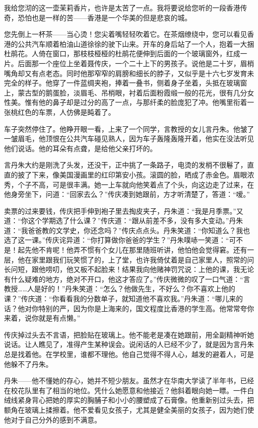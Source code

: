 \par 我给您沏的这一壶茉莉香片，也许是太苦了一点。我将要说给您听的一段香港传奇，恐怕也是一样的苦——香港是一个华美的但是悲哀的城。
\par 您先倒上一杯茶——当心烫！您尖着嘴轻轻吹着它。在茶烟缭绕中，您可以看见香港的公共汽车顺着柏油山道徐徐的驶下山来。开车的身后站了一个人，抱着一大捆杜鹃花。人倚在窗口，那枝枝桠桠的杜鹃花便伸到后面的一个玻璃窗外，红成一片。后面那一个座位上坐着聂传庆，一个二十上下的男孩子。说他是二十岁，眉梢嘴角却又有点老态。同时他那窄窄的肩膀和细长的脖子，又似乎是十六七岁发育未完全的样子。他穿了一件蓝绸夹袍，捧着一叠书，侧着身子坐着，头抵在玻璃窗上，蒙古型的鹅蛋脸，淡眉毛、吊梢眼，衬着后面粉霞缎一般的花光，很有几分女性美。惟有他的鼻子却是过分的高了一点，与那纤柔的脸庞犯了冲。他嘴里衔着一张桃红色的车票，人仿佛是盹着了。
\par 车子突然停住了。他睁开眼一看，上来了一个同学，言教授的女儿言丹朱。他皱了一皱眉毛，他顶恨在公共汽车碰见熟人，因为车子轰隆轰隆开着，他实在没法听见他们说话。他的耳朵有点聋，是给他父亲打坏的。
\par 言丹朱大约是刚洗了头发，还没干，正中挑了一条路子，电烫的发梢不很鬈了，直直的披了下来，像美国漫画里的红印第安小孩。滚圆的脸，晒成了赤金色。眉眼浓秀，个子不高，可是很丰满。她一上车就向他笑着点了个头，向这边走了过来，在他身旁坐下，问道：“回家去么？”传庆凑到她跟前，方才听清楚了，答道：“嗳。”
\par 卖票的过来要钱，传庆把手伸到袍子里去掏皮夹子，丹朱道：“我是月季票。”又道：“你这个学期选了什么课？”传庆道：“跟从前差不多，没有多大变动。”丹朱道：“我爸爸教的文学史，你还念吗？”传庆点点头。丹朱笑道：“你知道么？我也选了这一课。”传庆诧异道：“你打算做你爸爸的学生？”丹朱噗哧一笑道：“可不是！起先他不肯呢！他弄不惯有个女儿在那里随班听讲，他怕他会觉得窘。还有一层，他在家里跟我们玩笑惯了的，上了堂，也许我倚仗着是自己家里人，照常的问长问短，跟他唠叨，他又板不起脸来！结果我向他赌神罚咒说：上他的课，我无论有什么疑难的地方，绝对不开口，他这才答应了。”传庆微微的叹了一口气道：“言教授……人是好的！”丹朱笑道：“怎么？他做先生，不好么？你不喜欢上他的课？”传庆道：“你看看我的分数单子，就知道他不喜欢我。”丹朱道：“哪儿来的话？他对你特别的严，因为你是上海来的，国文程度比香港的学生高。他常常夸你来着，说你就是有点懒。”
\par 传庆掉过头去不言语，把脸贴在玻璃上。他不能老是凑在她跟前，用全副精神听她说话。让人瞧见了，准得产生某种误会。说闲话的人已经不少了，就是因为言丹朱总是找着他。在学校里，谁都不理他。他自己觉得不得人心，越发的避着人，可是他躲不了丹朱。
\par 丹朱——他不懂她的存心，她并不短少朋友。虽然才在华南大学读了半年书，已经在校花队里有了相当的地位。凭什么她愿意和他接近？他斜着眼向她一瞟。一件白绒线紧身背心把她的厚实的胸脯子和小小的腰塑成了石膏像。他重新别过头去，把额角在玻璃上揉擦着。他不爱看见女孩子，尤其是健全美丽的女孩子，因为她们使他对于自己分外的感到不满意。
